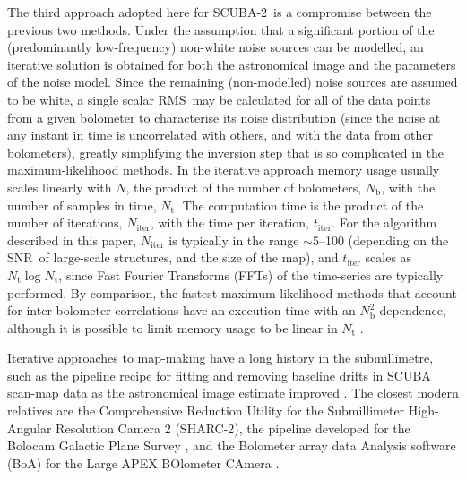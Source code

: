 \documentclass[useAMS,usenatbib,nofootinbib]{mn2e}
\newcommand{\snr}{SNR}
\newcommand{\scuba}{SCUBA-2}
\newcommand{\rms}{RMS}
\begin{document}
The third approach adopted here for \scuba\ is a compromise between
the previous two methods. Under the assumption that a significant
portion of the (predominantly low-frequency) non-white noise sources
can be modelled, an iterative solution is obtained for both the
astronomical image and the parameters of the noise model. Since the
remaining (non-modelled) noise sources are assumed to be white, a
single scalar \rms\ may be calculated for all of the data points from
a given bolometer to characterise its noise distribution (since the
noise at any instant in time is uncorrelated with others, and with the
data from other bolometers), greatly simplifying the inversion step
that is so complicated in the maximum-likelihood methods. In the
iterative approach memory usage usually scales linearly with $N$, the
product of the number of bolometers, $N_\mathrm{b}$, with the number
of samples in time, $N_\mathrm{t}$. The computation time is the
product of the number of iterations, $N_\mathrm{iter}$, with the time
per iteration, $t_\mathrm{iter}$. For the algorithm described in this
paper, $N_\mathrm{iter}$ is typically in the range $\sim$5--100
(depending on the \snr\ of large-scale structures, and the size of the
map), and $t_\mathrm{iter}$ scales as $N_\mathrm{t} \log
N_\mathrm{t}$, since Fast Fourier Transforms (FFTs) of the time-series
are typically performed. By comparison, the fastest maximum-likelihood
methods that account for inter-bolometer correlations have an
execution time with an $N_\mathrm{b}^2$ dependence, although it is
possible to limit memory usage to be linear in $N_\mathrm{t}$
\citep[e.g.,][]{patanchon2008}.

Iterative approaches to map-making have a long history in the
submillimetre, such as the pipeline recipe for fitting and removing
baseline drifts in SCUBA scan-map data as the astronomical image
estimate improved \citep{1999ASPC..172..171J}. The closest modern
relatives are the Comprehensive Reduction Utility
\citep[CRUSH,][]{kovacs2008} for the Submillimeter High-Angular
Resolution Camera 2 (SHARC-2), the pipeline developed for the Bolocam
Galactic Plane Survey \citep{aguirre2011}, and the Bolometer array
data Analysis software (BoA) for the Large APEX BOlometer CAmera
\citep[LABOCA,][]{schuller2012}.
\end{document}
